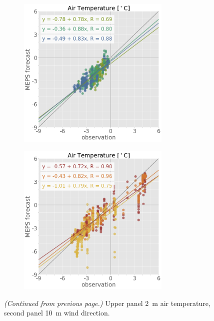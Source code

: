 \begin{figure}
	\begin{subfigure}[b]{0.49\textwidth}
		\centering
		\includegraphics[trim={25.cm 15.5cm 0cm 3.6cm},clip,
		width=0.8\textwidth]{./fig_sfc_temp/obs_model_20161221_23_00}
	\end{subfigure}
	\begin{subfigure}[b]{0.49\textwidth}
		\centering
		\includegraphics[trim={25.cm 15.5cm 0cm 3.6cm},clip,
		width=0.8\textwidth]{./fig_sfc_temp/obs_model_20161224_26_00}
	\end{subfigure}
	\caption{\textit{(Continued from previous page.)} Upper panel \SI{2}{\metre} air temperature, second panel \SI{10}{\metre} wind direction.}
\end{figure}
